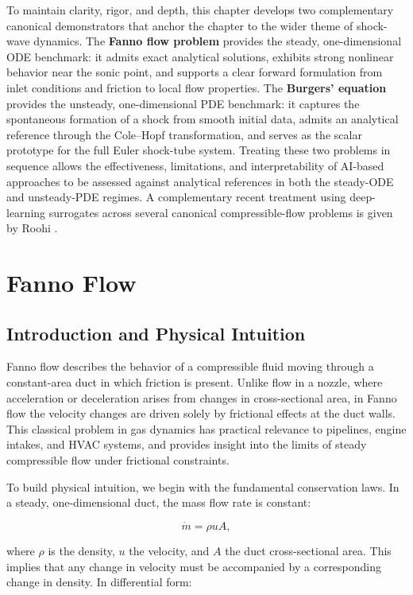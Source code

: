 \documentclass[11pt,a4paper]{report}
\begin{document}
To maintain clarity, rigor, and depth, this chapter develops two complementary canonical demonstrators that anchor the chapter to the wider theme of shock-wave dynamics. The \textbf{Fanno flow problem} provides the steady, one-dimensional ODE benchmark: it admits exact analytical solutions, exhibits strong nonlinear behavior near the sonic point, and supports a clear forward formulation from inlet conditions and friction to local flow properties. The \textbf{Burgers' equation} provides the unsteady, one-dimensional PDE benchmark: it captures the spontaneous formation of a shock from smooth initial data, admits an analytical reference through the Cole--Hopf transformation, and serves as the scalar prototype for the full Euler shock-tube system. Treating these two problems in sequence allows the effectiveness, limitations, and interpretability of AI-based approaches to be assessed against analytical references in both the steady-ODE and unsteady-PDE regimes. A complementary recent treatment using deep-learning surrogates across several canonical compressible-flow problems is given by Roohi \cite{Roohi2025}.


\section{Fanno Flow}

\subsection{Introduction and Physical Intuition}

Fanno flow describes the behavior of a compressible fluid moving through a constant-area duct in which friction is present. Unlike flow in a nozzle, where acceleration or deceleration arises from changes in cross-sectional area, in Fanno flow the velocity changes are driven solely by frictional effects at the duct walls. This classical problem in gas dynamics has practical relevance to pipelines, engine intakes, and HVAC systems, and provides insight into the limits of steady compressible flow under frictional constraints.

To build physical intuition, we begin with the fundamental conservation laws. In a steady, one-dimensional duct, the mass flow rate is constant:

\[
\dot{m} = \rho u A,
\]

where \(\rho\) is the density, \(u\) the velocity, and \(A\) the duct cross-sectional area. This implies that any change in velocity must be accompanied by a corresponding change in density. In differential form:
\end{document}
